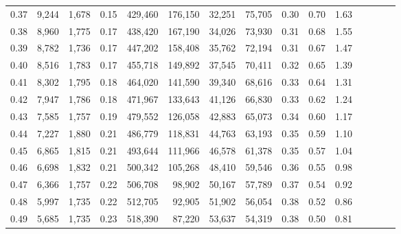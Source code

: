 \begin{tabular}{rrrcrrrrrrrrrrr}
0.37 &   9,244 &  1,678 &                                       0.15 &  429,460 &  176,150 &   32,251 &   75,705 &  0.30 &  0.70 &                         1.63 \\
0.38 &   8,960 &  1,775 &                                       0.17 &  438,420 &  167,190 &   34,026 &   73,930 &  0.31 &  0.68 &                         1.55 \\
0.39 &   8,782 &  1,736 &                                       0.17 &  447,202 &  158,408 &   35,762 &   72,194 &  0.31 &  0.67 &                         1.47 \\
0.40 &   8,516 &  1,783 &                                       0.17 &  455,718 &  149,892 &   37,545 &   70,411 &  0.32 &  0.65 &                         1.39 \\
0.41 &   8,302 &  1,795 &                                       0.18 &  464,020 &  141,590 &   39,340 &   68,616 &  0.33 &  0.64 &                         1.31 \\
0.42 &   7,947 &  1,786 &                                       0.18 &  471,967 &  133,643 &   41,126 &   66,830 &  0.33 &  0.62 &                         1.24 \\
0.43 &   7,585 &  1,757 &                                       0.19 &  479,552 &  126,058 &   42,883 &   65,073 &  0.34 &  0.60 &                         1.17 \\
0.44 &   7,227 &  1,880 &                                       0.21 &  486,779 &  118,831 &   44,763 &   63,193 &  0.35 &  0.59 &                         1.10 \\
0.45 &   6,865 &  1,815 &                                       0.21 &  493,644 &  111,966 &   46,578 &   61,378 &  0.35 &  0.57 &                         1.04 \\
0.46 &   6,698 &  1,832 &                                       0.21 &  500,342 &  105,268 &   48,410 &   59,546 &  0.36 &  0.55 &                         0.98 \\
0.47 &   6,366 &  1,757 &                                       0.22 &  506,708 &   98,902 &   50,167 &   57,789 &  0.37 &  0.54 &                         0.92 \\
0.48 &   5,997 &  1,735 &                                       0.22 &  512,705 &   92,905 &   51,902 &   56,054 &  0.38 &  0.52 &                         0.86 \\
0.49 &   5,685 &  1,735 &                                       0.23 &  518,390 &   87,220 &   53,637 &   54,319 &  0.38 &  0.50 &                         0.81 \\

\end{tabular}
